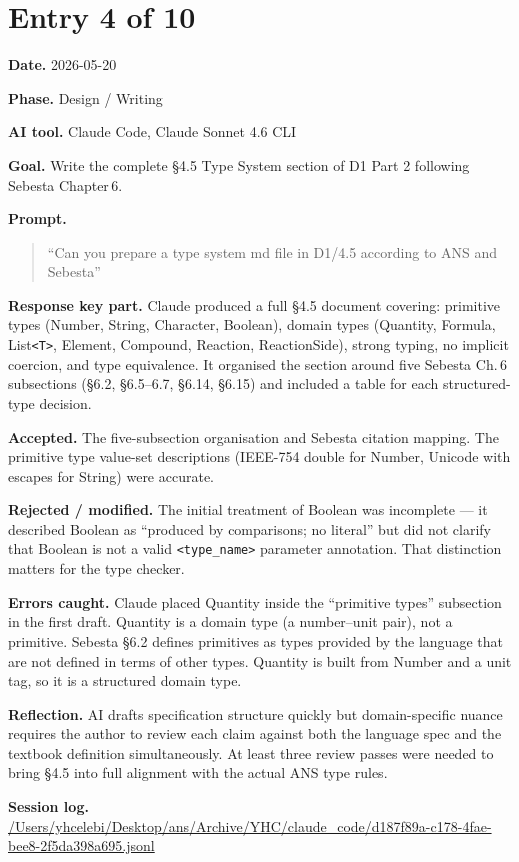 \documentclass[11pt,a4paper]{article}
\newcommand{\field}[2]{\textbf{#1.} #2\par}
\newcommand{\prompt}[1]{%
  \textbf{Prompt.}
  \begin{quote}\small #1\end{quote}
}
\newcommand{\sessionlog}[1]{\textbf{Session log.} \url{#1}\par}
\begin{document}
\section{Entry 4 of 10}
\field{Date}{2026-05-20}
\field{Phase}{Design / Writing}
\field{AI tool}{Claude Code, Claude Sonnet 4.6 CLI}
\field{Goal}{Write the complete \S4.5 Type System section of D1 Part 2 following Sebesta Chapter\,6.}
\prompt{``Can you prepare a type system md file in D1/4.5 according to ANS and Sebesta''}
\field{Response key part}{Claude produced a full \S4.5 document covering: primitive types (Number, String, Character, Boolean), domain types (Quantity, Formula, List\texttt{<T>}, Element, Compound, Reaction, ReactionSide), strong typing, no implicit coercion, and type equivalence. It organised the section around five Sebesta Ch.\,6 subsections (\S6.2, \S6.5--6.7, \S6.14, \S6.15) and included a table for each structured-type decision.}
\field{Accepted}{The five-subsection organisation and Sebesta citation mapping. The primitive type value-set descriptions (IEEE-754 double for Number, Unicode with escapes for String) were accurate.}
\field{Rejected / modified}{The initial treatment of Boolean was incomplete --- it described Boolean as ``produced by comparisons; no literal'' but did not clarify that Boolean is not a valid \texttt{<type\_name>} parameter annotation. That distinction matters for the type checker.}
\field{Errors caught}{Claude placed Quantity inside the ``primitive types'' subsection in the first draft. Quantity is a domain type (a number--unit pair), not a primitive. Sebesta \S6.2 defines primitives as types provided by the language that are not defined in terms of other types. Quantity is built from Number and a unit tag, so it is a structured domain type.}
\field{Reflection}{AI drafts specification structure quickly but domain-specific nuance requires the author to review each claim against both the language spec and the textbook definition simultaneously. At least three review passes were needed to bring \S4.5 into full alignment with the actual ANS type rules.}
\sessionlog{/Users/yhcelebi/Desktop/ans/Archive/YHC/claude_code/d187f89a-c178-4fae-bee8-2f5da398a695.jsonl}

\end{document}
